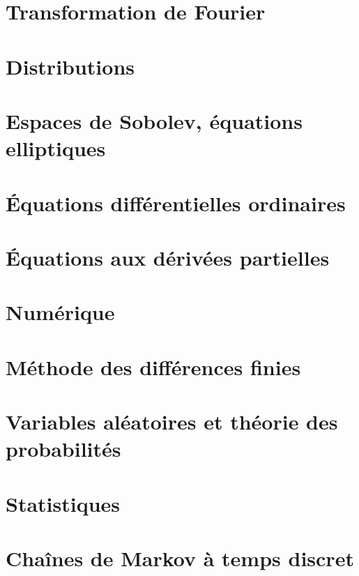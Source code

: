 \documentclass[a4paper,twoside,11pt]{book}
\begin{document}
\chapter{Transformation de Fourier}


\chapter{Distributions}


\chapter{Espaces de Sobolev, équations elliptiques}      \label{CHAPooVTIIooGOEvXT}


\chapter{Équations différentielles ordinaires}





\chapter{Équations aux dérivées partielles}


\chapter{Numérique}





\chapter{Méthode des différences finies}


\chapter{Variables aléatoires et théorie des probabilités}





\chapter{Statistiques}


\chapter{Chaînes de Markov à temps discret}

\end{document}

